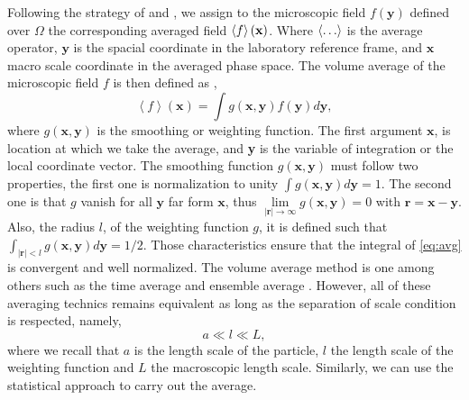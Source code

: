 
Following  the strategy of \citet{drew1983mathematical,zhang1994averaged} and \citet{jackson1997locally},  we assign to the microscopic field $f(\textbf{y})$ defined over $\Omega$ the corresponding averaged field $\left<f\right>(\textbf{x})$. 
Where $\left<\ldots\right>$ is the average operator, $\textbf{y}$ is the spacial coordinate in the laboratory reference frame,
and $\textbf{x}$ macro scale coordinate in the averaged phase space.
The volume average of the microscopic field $f$ is then defined as \citep{nott2011suspension,jackson1997locally,marle1982macroscopic},
\begin{equation}
    \left<f\right>(\textbf{x}) = \int g(\textbf{x},\textbf{y}) f(\textbf{y})d \textbf{y},
    \label{eq:avg}
\end{equation}
where $g(\textbf{x},\textbf{y})$ is the smoothing or weighting function.
The first argument $\textbf{x}$, is location at which we take the average, and \textbf{y} is the variable of integration or the local coordinate vector.
The smoothing function $g(\textbf{x},\textbf{y})$ must follow two properties, the first one is normalization to unity
$\int g(\textbf{x},\textbf{y}) d\textbf{y} = 1$.
The second one is that $g$ vanish for all $\textbf{y}$ far form $\textbf{x}$, thus $\lim\limits_{|\textbf{r}| \to \infty} g(\textbf{x},\textbf{y}) = 0$ with $\textbf{r} = \textbf{x} - \textbf{y}$.
Also, the radius $l$, of the weighting function $g$, it is defined such that $\int_{|\textbf{r}|<l} g(\textbf{x},\textbf{y})d\textbf{y} = 1/2$.
Those characteristics ensure that the integral of \ref{eq:avg} is convergent and well normalized.
The volume average method is one among others such as the time average \citep{ishii2010thermo} and ensemble average \citep{zhang1994averaged}. 
However, all of these averaging technics remains equivalent \citep{jackson1997locally} as long as the separation of scale condition is respected, namely,
\begin{equation*}
    a \ll l \ll L,
\end{equation*}
where we recall that $a$ is the length scale of the particle, $l$ the length scale of the weighting function and $L$ the macroscopic length scale.
Similarly, we can use the statistical approach to carry out the average. 
